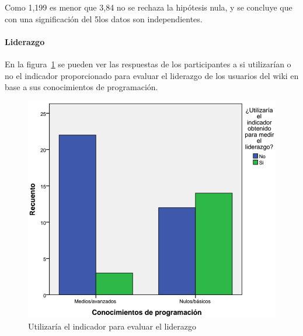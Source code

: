 \begin{center}
\end{center}

Como 1,199 es menor que 3,84 no se rechaza la hipótesis nula, y se concluye que con una significación del 5\percentage los datos son independientes.

\begin{center}
\end{center}

\paragraph*{Liderazgo}

En la figura~\ref{fig:app:barras:programacion:liderazgo} se pueden ver las respuestas de los participantes a si utilizarían o no el indicador proporcionado para evaluar el liderazgo de los usuarios del wiki en base a sus conocimientos de programación.

\begin{figure}
  \begin{center}
    \includegraphics[scale=0.3]{barras_programacion_liderazgo.png}
  \end{center}
  \caption{Utilizaría el indicador para evaluar el liderazgo}
  \label{fig:app:barras:programacion:liderazgo}
\end{figure}


